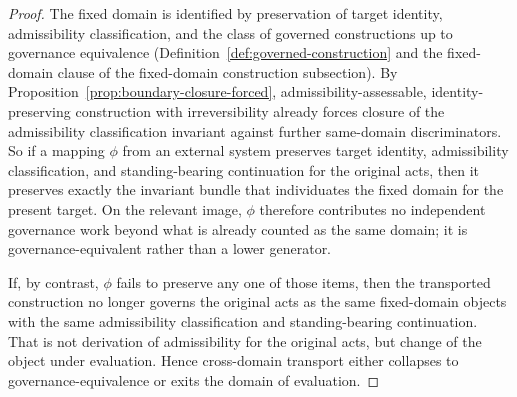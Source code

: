 \documentclass[11pt]{article}
\theoremstyle{definition}
\theoremstyle{remark}
\begin{document}
\begin{proof}
The fixed domain is identified by preservation of target identity, admissibility classification, and the class of governed constructions up to governance equivalence (Definition~\ref{def:governed-construction} and the fixed-domain clause of the fixed-domain construction subsection). By Proposition~\ref{prop:boundary-closure-forced}, admissibility-assessable, identity-preserving construction with irreversibility already forces closure of the admissibility classification invariant against further same-domain discriminators. So if a mapping $\phi$ from an external system preserves target identity, admissibility classification, and standing-bearing continuation for the original acts, then it preserves exactly the invariant bundle that individuates the fixed domain for the present target. On the relevant image, $\phi$ therefore contributes no independent governance work beyond what is already counted as the same domain; it is governance-equivalent rather than a lower generator.

If, by contrast, $\phi$ fails to preserve any one of those items, then the transported construction no longer governs the original acts as the same fixed-domain objects with the same admissibility classification and standing-bearing continuation. That is not derivation of admissibility for the original acts, but change of the object under evaluation. Hence cross-domain transport either collapses to governance-equivalence or exits the domain of evaluation.
\end{proof}
\end{document}
